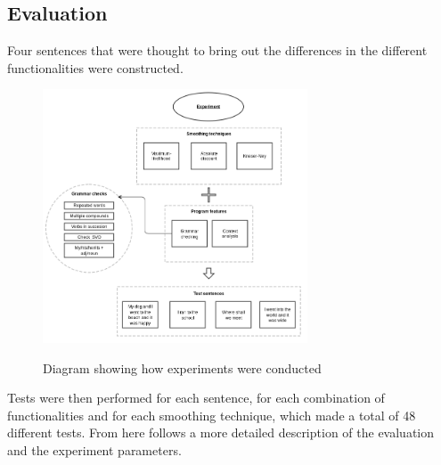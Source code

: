 \subsection{Evaluation}
Four sentences that were thought to bring out the differences in the different functionalities were constructed. 
\begin{figure}[h]
\center
\includegraphics[width=0.7\textwidth]{img/experiment_diagram.png}
\label{fig:experiments}
\caption{Diagram showing how experiments were conducted}
\end{figure}
Tests were then performed for each sentence, for each combination of functionalities and for each smoothing technique, which made a total of 48 different tests. From here follows a more detailed description of the evaluation and the experiment parameters.